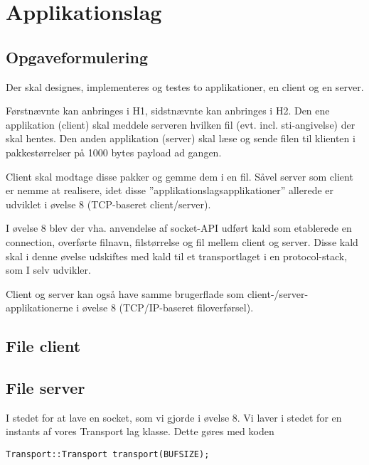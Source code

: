\chapter{Applikationslag}

\section{Opgaveformulering}

Der skal designes, implementeres og testes to applikationer, en client og en server.

Førstnævnte kan anbringes i H1, sidstnævnte kan anbringes i H2.
Den ene applikation (client) skal meddele serveren hvilken fil (evt. incl. sti-angivelse) der skal hentes.
Den anden applikation (server) skal læse og sende filen til klienten i pakkestørrelser på 1000 bytes payload ad gangen.

Client skal modtage disse pakker og gemme dem i en fil.
Såvel server som client er nemme at realisere, idet disse ”applikationslagsapplikationer” allerede er udviklet i øvelse 8 (TCP-baseret client/server).

I øvelse 8 blev der vha. anvendelse af socket-API udført kald som etablerede en connection, overførte filnavn, filstørrelse og fil mellem client og server. Disse kald skal i denne øvelse udskiftes med kald til et transportlaget i en protocol-stack, som I selv udvikler. 

Client og server kan også have samme brugerflade som client-/server-applikationerne i øvelse 8 (TCP/IP-baseret filoverførsel).

\section{File client}



\section{File server}

I stedet for at lave en socket, som vi gjorde i øvelse 8. Vi laver i stedet for en instants af vores Transport lag klasse. Dette gøres med koden 

\begin{lstlisting}
Transport::Transport transport(BUFSIZE);
\end{lstlisting}





 




 


